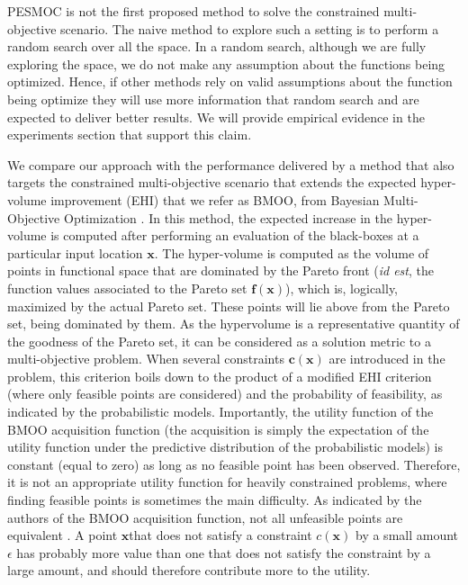 PESMOC is not the first proposed method to solve the constrained multi-objective scenario. The naive method to explore such a setting is to perform a random search over all the space. In a random search, although we are fully exploring the space, we do not make any assumption about the functions being optimized. Hence, if other methods rely on valid assumptions about the function being optimize they will use more information that random search and are expected to deliver better results. We will provide empirical evidence in the experiments section that support this claim.

We compare our approach with the performance delivered by a method that also targets the constrained multi-objective scenario that extends the expected hyper-volume improvement (EHI) that we refer as BMOO, from Bayesian Multi-Objective Optimization \citep{feliot2015bayesian}. In this method, the expected increase in the hyper-volume is computed after performing an evaluation of the black-boxes at a particular input location $\mathbf{x}$. The hyper-volume is computed as the volume
of points in functional space that are dominated by the Pareto front (\emph{id est}, the function values associated
to the Pareto set $\mathbf{f}(\mathbf{x})$), which is, logically, maximized by the actual Pareto set. These points will lie above from the Pareto set, being dominated by them.
As the hypervolume is a representative quantity of the goodness of the Pareto set, it can be considered as a solution metric to a multi-objective problem. When several constraints $\mathbf{c}(\mathbf{x})$ are introduced in the problem, this criterion boils down to
the product of a modified EHI criterion (where only feasible points are considered) and the probability of
feasibility, as indicated by the probabilistic models. Importantly, the utility function
of the BMOO acquisition function (the acquisition is simply the expectation of the utility function under
the predictive distribution of the probabilistic models) is constant (equal to zero) as long as no feasible
point has been observed. Therefore, it is not an appropriate utility function for heavily constrained problems, where
finding feasible points is sometimes the main difficulty. As indicated by the authors of the BMOO acquisition function, not all
unfeasible points are equivalent \citep{feliot2015bayesian}. A point $\mathbf{x} $that does not satisfy a constraint $c(\mathbf{x})$ by a small amount $\epsilon$ has probably
more value than one that does not satisfy the constraint by a large amount, and should therefore contribute more to the utility.

